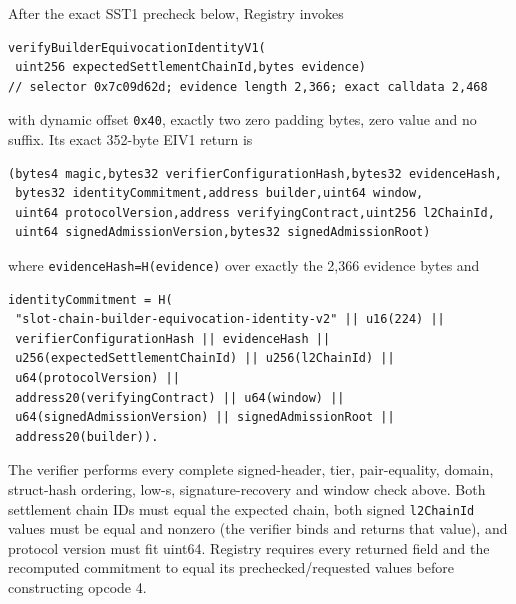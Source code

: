 \documentclass[a4paper,11pt]{article}
\newcommand{\code}[1]{\nolinkurl{#1}}
\begin{document}
After the exact SST1 precheck below, Registry invokes
\begin{verbatim}
verifyBuilderEquivocationIdentityV1(
 uint256 expectedSettlementChainId,bytes evidence)
// selector 0x7c09d62d; evidence length 2,366; exact calldata 2,468
\end{verbatim}
with dynamic offset \code{0x40}, exactly two zero padding bytes, zero value and
no suffix.  Its exact 352-byte EIV1 return is
\begin{verbatim}
(bytes4 magic,bytes32 verifierConfigurationHash,bytes32 evidenceHash,
 bytes32 identityCommitment,address builder,uint64 window,
 uint64 protocolVersion,address verifyingContract,uint256 l2ChainId,
 uint64 signedAdmissionVersion,bytes32 signedAdmissionRoot)
\end{verbatim}
where \code{evidenceHash=H(evidence)} over exactly the 2,366 evidence bytes and
\begin{verbatim}
identityCommitment = H(
 "slot-chain-builder-equivocation-identity-v2" || u16(224) ||
 verifierConfigurationHash || evidenceHash ||
 u256(expectedSettlementChainId) || u256(l2ChainId) ||
 u64(protocolVersion) ||
 address20(verifyingContract) || u64(window) ||
 u64(signedAdmissionVersion) || signedAdmissionRoot ||
 address20(builder)).
\end{verbatim}
The verifier performs every complete signed-header, tier, pair-equality,
domain, struct-hash ordering, low-s, signature-recovery and window check above.
Both settlement chain IDs must equal the expected chain, both signed
\code{l2ChainId} values must be equal and nonzero (the verifier binds and
returns that value), and protocol version must fit uint64.  Registry requires every returned field and the recomputed commitment
to equal its prechecked/requested values before constructing opcode 4.
\end{document}
